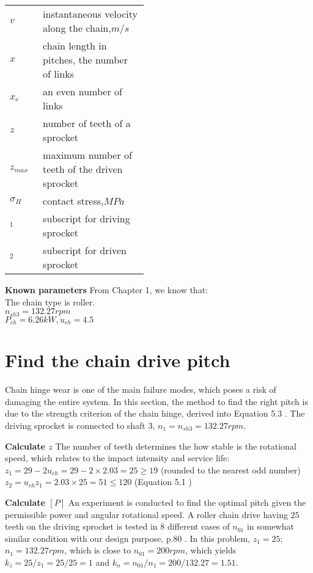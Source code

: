 \begin{tabular}[t]{p{0.05\linewidth}p{0.4\linewidth}}
	$ v $ & instantaneous velocity along the chain,$ \unit{m/s} $\\
	$ x $ & chain length in pitches, the number of links\\
	$ x_c $ & an even number of links\\
	$ z $ & number of teeth of a sprocket\\
	$ z_{max} $ & maximum number of teeth of the driven sprocket\\
	$ \sigma_H $ & contact stress,$ \unit{MPa} $\\
	$ _1 $  & subscript for driving sprocket\\
	$ _2 $  & subscript for driven sprocket\\
\end{tabular}

\textbf{Known parameters} From Chapter 1, we know that:\\
The chain type is roller.\\
$ n_{sh3}= 132.27 \unit{rpm}$\\
$ P_{ch} = 6.26\unit{kW}, u_{ch}=4.5 $

\section{Find the chain drive pitch}
Chain hinge wear is one of the main failure modes, which poses a risk of damaging the entire system.  In this section, the method to find the right pitch is due to the strength criterion of the chain hinge, derived into Equation 5.3 \cite{tk1}. The driving sprocket is connected to shaft 3, $ n_1 = n_{sh3} = 132.27\unit{rpm} $.

\textbf{Calculate $ z $}
The number of teeth determines the how stable is the rotational speed, which relates to the impact intensity and service life:\\
$ z_1 = 29 - 2u_{ch} = 29 - 2 \times 2.03 = 25 \geq 19 $ (rounded to the nearest odd number)\\
$ z_2 = u_{ch}z_1 = 2.03 \times 25 = 51 \leq 120$ (Equation 5.1 \cite{tk1})

\textbf{Calculate $ [P] $} An experiment is conducted to find the optimal pitch given the permissible power and angular rotational speed. A roller chain drive having $ 25 $ teeth on the driving sprocket is tested in 8 different cases of $ n_{01} $ in somewhat similar condition with our design purpose, p.80 \cite{tk1}. In this problem, $ z_1=25 $; $ n_1=132.27\unit{rpm} $, which is close to $ n_{01}=200\unit{rpm} $, which yields $ k_z = {25}/{z_1} = 25/25 = 1 $ and $  k_n = {n_{01}}/{n_{1}} = 200/132.27 = 1.51 $. 

